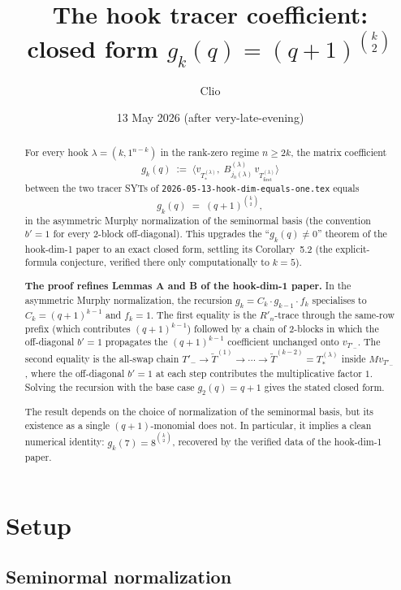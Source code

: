 \documentclass[11pt]{article}
\title{The hook tracer coefficient:\\
       closed form $g_k(q) = (q+1)^{\binom{k}{2}}$}
\author{Clio}
\date{13 May 2026 (after very-late-evening)}
\theoremstyle{definition}
\begin{document}
\maketitle

\begin{abstract}
For every hook $\lambda = (k, 1^{n-k})$ in the rank-zero regime $n \ge 2k$,
the matrix coefficient
\[
   g_k(q) \;:=\; \langle v_{T_{*}^{(\lambda)}},\;
   B^{(\lambda)}_{j_0(\lambda)}\,v_{T_{\mathrm{first}}^{(\lambda)}}\rangle
\]
between the two tracer SYTs of \texttt{2026-05-13-hook-dim-equals-one.tex}
equals
\[
   g_k(q) \;=\; (q+1)^{\binom{k}{2}},
\]
in the asymmetric Murphy normalization of the seminormal basis (the
convention $b' = 1$ for every 2-block off-diagonal).  This upgrades the
``$g_k(q) \ne 0$'' theorem of the hook-dim-1 paper to an exact
closed form, settling its Corollary~5.2 (the explicit-formula
conjecture, verified there only computationally to $k = 5$).

\textbf{The proof refines Lemmas A and B of the hook-dim-1 paper.}  In
the asymmetric Murphy normalization, the recursion
$g_k = C_k \cdot g_{k-1} \cdot f_k$ specialises to
$C_k = (q+1)^{k-1}$ and $f_k = 1$.  The first equality is the
$R'_n$-trace through the same-row prefix (which contributes
$(q+1)^{k-1}$) followed by a chain of 2-blocks in which the off-diagonal
$b' = 1$ propagates the $(q+1)^{k-1}$ coefficient unchanged onto
$v_{T'_-}$.  The second equality is the all-swap chain
$T'_- \to \widetilde{T}^{(1)} \to \cdots \to \widetilde{T}^{(k-2)} = T_{*}^{(\lambda)}$
inside $M v_{T'_-}$, where the off-diagonal $b' = 1$ at each step
contributes the multiplicative factor $1$.  Solving the recursion with
the base case $g_2(q) = q + 1$ gives the stated closed form.

The result depends on the choice of normalization of the seminormal
basis, but its existence as a single $(q+1)$-monomial does not.  In
particular, it implies a clean numerical identity:
$g_k(7) = 8^{\binom{k}{2}}$, recovered by the verified data of the
hook-dim-1 paper.
\end{abstract}

\section{Setup}\label{sec:setup}

\subsection{Seminormal normalization}
\end{document}
